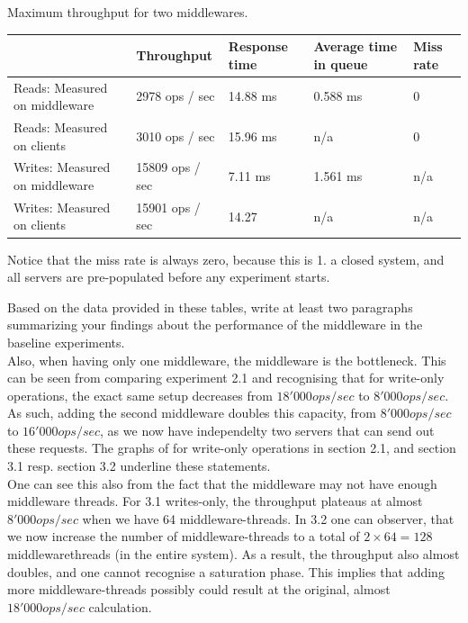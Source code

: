 \documentclass[11pt,a4paper]{article}
\begin{document}
\begin{center}
	{Maximum throughput for two middlewares.}
	\begin{tabular}{|l|p{2cm}|p{2cm}|p{2cm}|p{2cm}|}
		\hline                                & Throughput & Response time & Average time in queue & Miss rate \\ 
		\hline Reads: Measured on middleware  & 2978 ops / sec & 14.88 ms & 0.588 ms &           0\\ 
		\hline Reads: Measured on clients     & 3010 ops / sec &  15.96 ms & n/a               &           0\\ 
		\hline Writes: Measured on middleware & 15809 ops / sec & 7.11 ms & 1.561 ms & n/a       \\ 
		\hline Writes: Measured on clients    & 15901 ops / sec & 14.27 & n/a              & n/a       \\ 
		\hline 
	\end{tabular}
\end{center}

Notice that the miss rate is always zero, because this is 1. a closed system, and all servers are pre-populated before any experiment starts.

Based on the data provided in these tables, write at least two paragraphs summarizing your findings about the performance of the middleware in the baseline experiments. \\

Also, when having only one middleware, the middleware is the bottleneck.
This can be seen from comparing experiment 2.1 and recognising that for write-only operations, the exact same setup decreases from $18'000 ops/sec$ to $8'000 ops/sec$.
As such, adding the second middleware doubles this capacity, from $8'000 ops/sec$ to $16'000 ops/sec$, as we now have independelty two servers that can send out these requests.
The graphs of for write-only operations in section 2.1, and section 3.1 resp. section 3.2 underline these statements. \\

One can see this also from the fact that the middleware may not have enough middleware threads.
For 3.1 writes-only, the throughput plateaus at almost $8'000 ops/sec$ when we have 64 middleware-threads.
In 3.2 one can observer, that we now increase the number of middleware-threads to a total of $2 \times 64 = 128$ middlewarethreads (in the entire system). 
As a result, the throughput also almost doubles, and one cannot recognise a saturation phase.
This implies that adding more middleware-threads possibly could result at the original, almost $18'000 ops/sec$ calculation. \\
\end{document}
